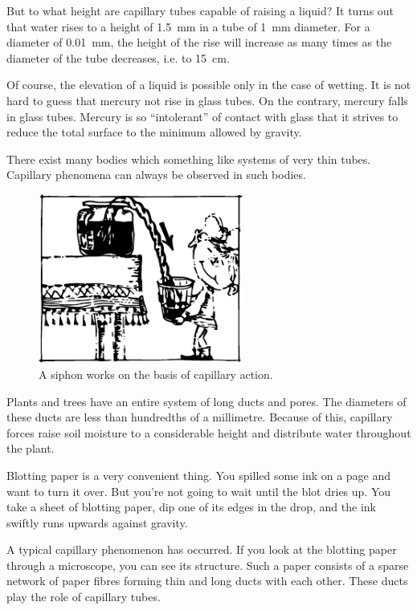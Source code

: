 But to what height are capillary tubes capable of raising a liquid? It turns out that water rises to a height of \SI{1.5}{\milli\meter} in a tube of \SI{1}{\milli\meter} diameter. For a diameter of \SI{0.01}{\milli\meter}, the height of the rise will increase as many
times as the diameter of the tube decreases, i.e. to \SI{15}{\centi\meter}.

Of course, the elevation of a liquid is possible only in the case of wetting. It is not hard to guess that mercury not rise in glass tubes. On the contrary, mercury falls in glass tubes. Mercury is so ``intolerant'' of contact with glass that it strives to reduce the total surface to the minimum allowed by gravity.

There exist many bodies which something like systems of very thin tubes. Capillary phenomena can always be observed in such bodies.


\begin{figure}[!ht]
\centering
\includegraphics[width=0.6\textwidth]{figures/fig-02-05.pdf}
\caption{A siphon works on the basis of capillary action.}
\label{fig-2.5}
\end{figure}

Plants and trees have an entire system of long ducts and pores. The diameters of these ducts are less than hundredths of a millimetre. Because of this, capillary forces raise soil moisture to a considerable height and distribute water throughout the plant.

Blotting paper is a very convenient thing. You spilled some ink on a page and want to turn it over. But you’re not going to wait until the blot dries up. You take a sheet of blotting paper, dip one of its edges in the drop, and the ink swiftly runs upwards against gravity.

A typical capillary phenomenon has occurred. If you look at the blotting paper through a microscope, you can see its structure. Such a paper consists of a sparse network of paper fibres forming thin and long ducts with each other. These ducts play the role of capillary tubes.


